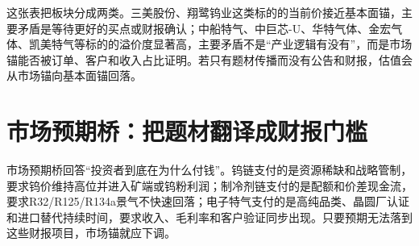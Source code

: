 这张表把板块分成两类。三美股份、翔鹭钨业这类标的的当前价接近基本面锚，主要矛盾是等待更好的买点或财报确认；中船特气、中巨芯-U、华特气体、金宏气体、凯美特气等标的的溢价度显著高，主要矛盾不是“产业逻辑有没有”，而是市场锚能否被订单、客户和收入占比证明。若只有题材传播而没有公告和财报，估值会从市场锚向基本面锚回落。

\section{市场预期桥：把题材翻译成财报门槛}
市场预期桥回答“投资者到底在为什么付钱”。钨链支付的是资源稀缺和战略管制，要求钨价维持高位并进入矿端或钨粉利润；制冷剂链支付的是配额和价差现金流，要求R32/R125/R134a景气不快速回落；电子特气支付的是高纯品类、晶圆厂认证和进口替代持续时间，要求收入、毛利率和客户验证同步出现。只要预期无法落到这些财报项目，市场锚就应下调。

